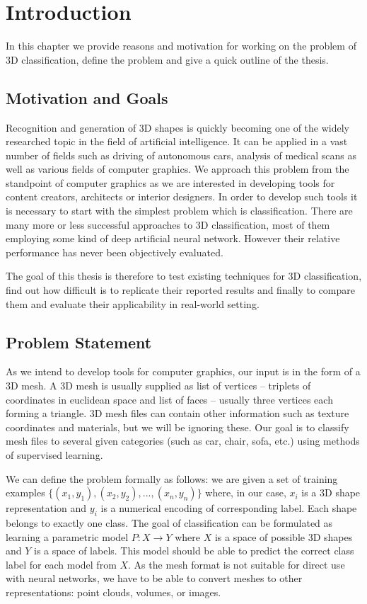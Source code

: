 \chapter{Introduction}
\label{sec:chap1}
In this chapter we provide reasons and motivation for working on the problem of 3D classification, define the problem and give a quick outline of the thesis.

\section{Motivation and Goals}
Recognition and generation of 3D shapes is quickly becoming one of the widely researched topic in the field of artificial intelligence. It can be applied in a vast number of fields such as driving of autonomous cars, analysis of medical scans as well as various fields of computer graphics. We approach this problem from the standpoint of computer graphics as we are interested in developing tools for content creators, architects or interior designers. In order to develop such tools it is necessary to start with the simplest problem which is classification. 
There are many more or less successful approaches to 3D classification, most of them employing some kind of deep artificial neural network. However their relative performance has never been objectively evaluated.\par
The goal of this thesis is therefore to test existing techniques for 3D classification, find out how difficult is to replicate their reported results and finally to compare them and evaluate their applicability in real-world setting.
\section{Problem Statement}
As we intend to develop tools for computer graphics, our input is in the form of a 3D mesh. A 3D mesh is usually supplied as list of vertices -- triplets of coordinates in euclidean space and list of faces -- usually three vertices each forming a triangle. 3D mesh files can contain other information such as texture coordinates and materials, but we will be ignoring these. Our goal is to classify mesh files to several given categories (such as car, chair, sofa, etc.) using methods of supervised learning.\par
We can define the problem formally as follows: we are given a set of training examples $\{(x_1,y_1),(x_2,y_2), ..., (x_n,y_n)\}$ where, in our case, $x_i$ is a 3D shape representation and $y_i$ is a numerical encoding of corresponding label. Each shape belongs to exactly one class. The goal of classification can be formulated as learning a parametric model $P:X \rightarrow Y$ where $X$ is a space of possible 3D shapes and $Y$ is a space of labels. This model should be able to predict the correct class label for each model from $X$.
As the mesh format is not suitable for direct use with neural networks, we have to be able to convert meshes to other representations: point clouds, volumes, or images.
